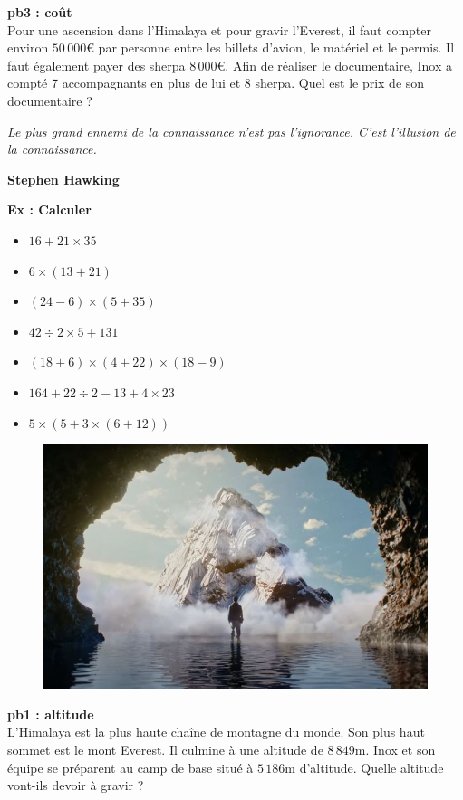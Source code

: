 \textbf{pb3 : coût} \\

Pour une ascension dans l’Himalaya et pour gravir l’Everest, il faut compter environ $50\,000$€ par personne entre les billets d'avion, le matériel et le permis. Il faut également payer des sherpa $8\,000$€. Afin de réaliser le documentaire, Inox a compté 7 accompagnants en plus de lui et 8 sherpa. Quel est le prix de son documentaire ?


\newpage

\begin{center}
  \textit{Le plus grand ennemi de la connaissance n'est pas l'ignorance. C'est l'illusion de la connaissance.} 
  
  \textbf{Stephen Hawking}
\end{center}

\textbf{Ex : Calculer} 

\begin{multicols}{2} \begin{itemize}[label={$\bullet$}]
  \item $16 + 21 \times 35$ 
  \item $6 \times (13 + 21)$ 
  \item $(24 - 6) \times (5 + 35)$
  \item $42 \div 2 \times 5 + 131$
  \item $(18 + 6) \times (4 + 22) \times (18 - 9)$
  \item $164 + 22 \div 2 - 13 + 4 \times 23$
  \item $5 \times ( 5 + 3 \times (6 + 12))$
\end{itemize} \end{multicols}


\begin{figure}[H]
  \centering
  \includegraphics[width=0.4\linewidth]{5x1-calcul-numerique/kaizen.jpg}
\end{figure}

\textbf{pb1 : altitude} \\

L'Himalaya est la plus haute chaîne de montagne du monde. Son plus haut sommet est le mont Everest. Il culmine à une altitude de $8\,849$m. Inox et son équipe se préparent au camp de base situé à $5\,186$m d'altitude. Quelle altitude vont-ils devoir à gravir ? \\


